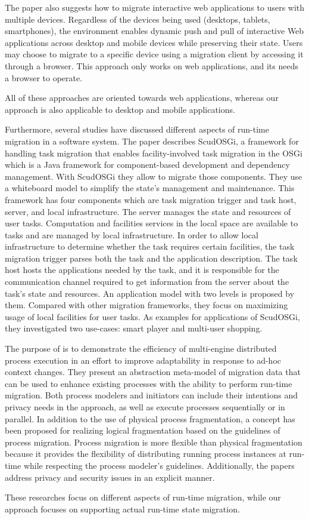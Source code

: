 The paper \cite{r6-10.1145/2254556.2254563} also suggests how to migrate interactive web applications to users with multiple devices.
Regardless of the devices being used (desktops, tablets, smartphones), the environment enables dynamic push and pull of interactive Web applications across desktop and mobile devices while preserving their state.
Users may choose to migrate to a specific device using a migration client by accessing it through a browser.
This approach only works on web applications, and its needs a browser to operate.

All of these approaches are oriented towards web applications, whereas our approach is also applicable to desktop and mobile applications.

Furthermore, several studies have discussed different aspects of run-time migration in a software system. The paper \cite{r4-5392926} describes ScudOSGi, a framework for handling task migration that enables facility-involved task migration in the OSGi which is a Java framework for component-based development and dependency management. With ScudOSGi they allow to migrate those components.
They use a whiteboard model to simplify the state’s management and maintenance.
This framework has four components which are task migration trigger and task host, server, and local infrastructure. 
The server manages the state and resources of user tasks.
Computation and facilities services in the local space are available to tasks and are managed by local infrastructure.
In order to allow local infrastructure to determine whether the task requires certain facilities, the task migration trigger parses both the task and the application description.
The task host hosts the applications needed by the task, and it is responsible for the communication channel required to get information from the server about the task’s state and resources.
An application model with two levels is proposed by them. 
Compared with other migration frameworks, they focus on maximizing usage of local facilities for user tasks.
As examples for applications of ScudOSGi, they investigated two use-cases: smart player and multi-user shopping.

The purpose of \cite{r3-10.1145/2556288.2557199} is to demonstrate the efficiency of multi-engine distributed process execution in an effort to improve adaptability in response to ad-hoc context changes.
They present an abstraction meta-model of migration data that can be used to enhance existing processes with the ability to perform run-time migration.
Both process modelers and initiators can include their intentions and privacy needs in the approach, as well as execute processes sequentially or in parallel.
In addition to the use of physical process fragmentation, a concept has been proposed for realizing logical fragmentation based on the guidelines of process migration.
Process migration is more flexible than physical fragmentation because it provides the flexibility of distributing running process instances at run-time while respecting the process modeler’s guidelines.
Additionally, the papers address privacy and security issues in an explicit manner.

These researches focus on different aspects of run-time migration, while our approach focuses on supporting actual run-time state migration.
